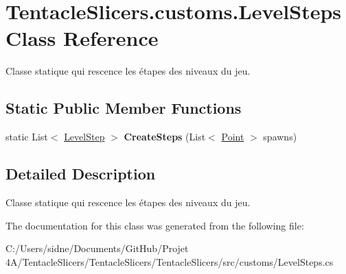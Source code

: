\hypertarget{class_tentacle_slicers_1_1customs_1_1_level_steps}{}\section{Tentacle\+Slicers.\+customs.\+Level\+Steps Class Reference}
\label{class_tentacle_slicers_1_1customs_1_1_level_steps}


Classe statique qui rescence les étapes des niveaux du jeu.  


\subsection*{Static Public Member Functions}
\begin{DoxyCompactItemize}
\item 
\mbox{\label{class_tentacle_slicers_1_1customs_1_1_level_steps_ab9f9a1f005a6d94537c60418ed14d633}} 
static List$<$ \hyperlink{class_tentacle_slicers_1_1levels_1_1_level_step}{Level\+Step} $>$ {\bfseries Create\+Steps} (List$<$ \hyperlink{class_tentacle_slicers_1_1general_1_1_point}{Point} $>$ spawns)
\end{DoxyCompactItemize}


\subsection{Detailed Description}
Classe statique qui rescence les étapes des niveaux du jeu. 



The documentation for this class was generated from the following file\+:\begin{DoxyCompactItemize}
\item 
C\+:/\+Users/sidne/\+Documents/\+Git\+Hub/\+Projet 4\+A/\+Tentacle\+Slicers/\+Tentacle\+Slicers/\+Tentacle\+Slicers/src/customs/Level\+Steps.\+cs\end{DoxyCompactItemize}
